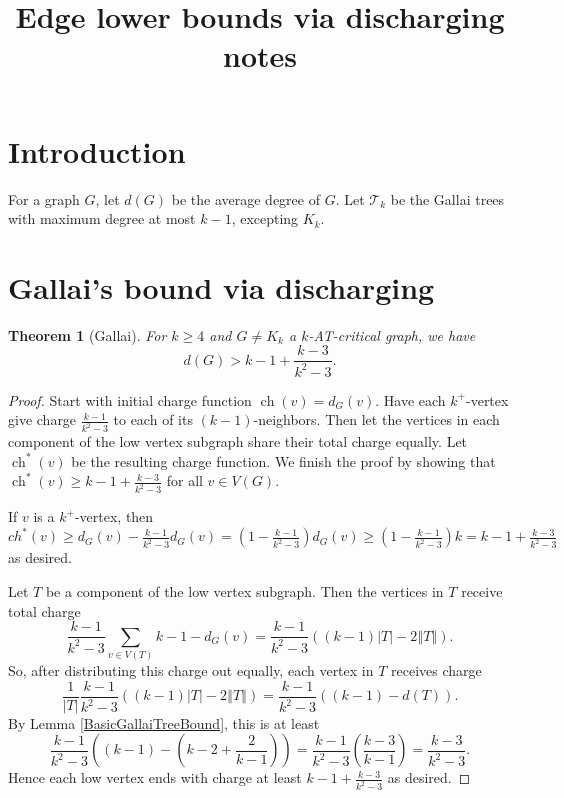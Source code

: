 \documentclass[12pt]{article}
\title{Edge lower bounds via discharging notes}
\theoremstyle{plain}
\newtheorem{thm}{Theorem}[section]
\theoremstyle{definition}
\theoremstyle{remark}
\newcommand{\fancy}[1]{\mathcal{#1}}
\newcommand{\T}{\fancy{T}}
\newcommand{\size}[1]{\left\Vert#1\right\Vert}
\newcommand{\parens}[1]{\left( #1 \right)}
\newcommand{\ch}{\operatorname{ch}}
\begin{document}
\maketitle

\section{Introduction}
For a graph $G$, let $d(G)$ be the average degree of $G$. Let $\T_k$ be the Gallai trees with maximum degree at most $k-1$, excepting $K_k$. 

\section{Gallai's bound via discharging}

\begin{thm}[Gallai]
	For $k \ge 4$ and $G \ne K_k$ a $k$-AT-critical graph, we have
	\[d(G) > k-1 + \frac{k-3}{k^2-3}.\]
\end{thm}
\begin{proof}
	Start with initial charge function $\ch(v) = d_G(v)$.  Have each $k^+$-vertex give charge $\frac{k-1}{k^2-3}$ to each of its $(k-1)$-neighbors.  Then let the vertices in each component of the low vertex subgraph share their total charge equally.  Let $\ch^*(v)$ be the resulting charge function.  We finish the proof by showing that $\ch^*(v) \ge k-1 + \frac{k-3}{k^2-3}$ for all $v \in V(G)$.
	
	If $v$ is a $k^+$-vertex, then $ch^*(v) \ge d_G(v) - \frac{k-1}{k^2-3}d_G(v) = \parens{1- \frac{k-1}{k^2-3}}d_G(v) \ge \parens{1- \frac{k-1}{k^2-3}}k = k-1 + \frac{k-3}{k^2-3}$ as desired.

	Let $T$ be a component of the low vertex subgraph.  Then the vertices in $T$ receive total charge
	\[\frac{k-1}{k^2-3}\sum_{v \in V(T)} k-1 - d_G(v) = \frac{k-1}{k^2-3}\parens{(k-1)|T| - 2\size{T}}.\]
	So, after distributing this charge out equally, each vertex in $T$ receives charge
	\[\frac{1}{|T|}\frac{k-1}{k^2-3}((k-1)|T| - 2\size{T}) = \frac{k-1}{k^2-3}\parens{(k-1) - d(T)}.\]
	By Lemma \ref{BasicGallaiTreeBound}, this is at least
	\[\frac{k-1}{k^2-3}\parens{(k-1) - \parens{k-2 + \frac{2}{k-1}}} = \frac{k-1}{k^2-3}\parens{\frac{k-3}{k-1}} = \frac{k-3}{k^2-3}.\]
	Hence each low vertex ends with charge at least $k-1 + \frac{k-3}{k^2-3}$ as desired.
\end{proof}
\end{document}
